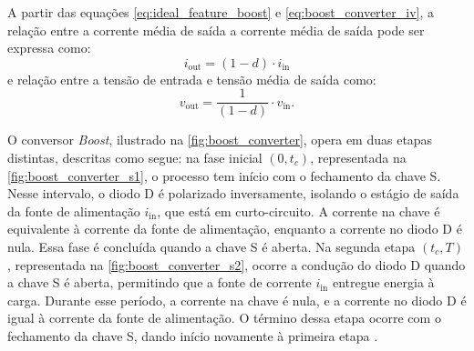 A partir das equações \eqref{eq:ideal_feature_boost} e \eqref{eq:boost_converter_iv}, a relação entre a corrente média de saída a corrente média de saída pode ser expressa como: \begin{equation} i_{\mathrm{out}} = (1 - d) \cdot i_{\mathrm{in}} \label{eq:boost_converter_current_transfer} \end{equation} e relação entre a tensão de entrada e tensão média de saída como: \begin{equation} v_{\mathrm{out}} = \frac{1}{(1 - d)} \cdot v_{\mathrm{in}}. \label{eq:boost_converter_voltage_transfer}\end{equation}

O conversor \textit{Boost}, ilustrado na \autoref{fig:boost_converter}, opera em duas etapas distintas, descritas como segue: na fase inicial $(0, t_c)$, representada na \autoref{fig:boost_converter_s1}, o processo tem início com o fechamento da chave S. Nesse intervalo, o diodo D é polarizado inversamente, isolando o estágio de saída da fonte de alimentação $i_{\mathrm{in}}$, que está em curto-circuito. A corrente na chave é equivalente à corrente da fonte de alimentação, enquanto a corrente no diodo D é nula. Essa fase é concluída quando a chave S é aberta. Na segunda etapa $(t_c, T)$, representada na \autoref{fig:boost_converter_s2}, ocorre a condução do diodo D quando a chave S é aberta, permitindo que a fonte de corrente $i_{\mathrm{in}}$ entregue energia à carga. Durante esse período, a corrente na chave é nula, e a corrente no diodo D é igual à corrente da fonte de alimentação. O término dessa etapa ocorre com o fechamento da chave S, dando início novamente à primeira etapa \citep{martins2008}.


